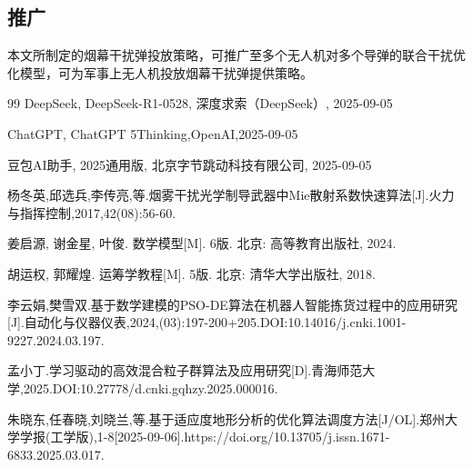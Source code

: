 \documentclass[withoutpreface]{cumcmthesis}
\begin{document}
\subsection{推广}
本文所制定的烟幕干扰弹投放策略，可推广至多个无人机对多个导弹的联合干扰优化模型，可为军事上无人机投放烟幕干扰弹提供策略。
\begin{thebibliography}{99}
DeepSeek, DeepSeek-R1-0528, 深度求索（DeepSeek）, 2025-09-05

ChatGPT, ChatGPT 5Thinking,OpenAI,2025-09-05

豆包AI助手, 2025通用版, 北京字节跳动科技有限公司, 2025-09-05

杨冬英,邱选兵,李传亮,等.烟雾干扰光学制导武器中Mie散射系数快速算法[J].火力与指挥控制,2017,42(08):56-60.

姜启源, 谢金星, 叶俊. 数学模型[M]. 6版. 北京: 高等教育出版社, 2024.

胡运权, 郭耀煌. 运筹学教程[M]. 5版. 北京: 清华大学出版社, 2018.

李云娟,樊雪双.基于数学建模的PSO-DE算法在机器人智能拣货过程中的应用研究[J].自动化与仪器仪表,2024,(03):197-200+205.DOI:10.14016/j.cnki.1001-9227.2024.03.197.

孟小丁.学习驱动的高效混合粒子群算法及应用研究[D].青海师范大学,2025.DOI:10.27778/d.cnki.gqhzy.2025.000016.

朱晓东,任春晓,刘晓兰,等.基于适应度地形分析的优化算法调度方法[J/OL].郑州大学学报(工学版),1-8[2025-09-06].https://doi.org/10.13705/j.issn.1671-6833.2025.03.017.

\end{thebibliography}
\end{document}
